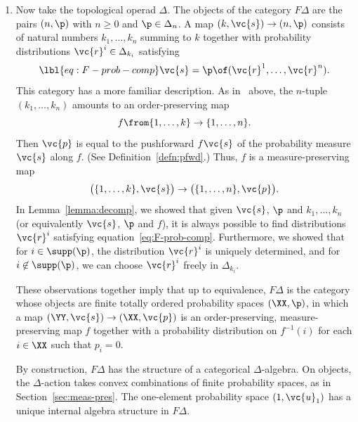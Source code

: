 \begin{examples}
\begin{enumerate}
\item
{}
Now take the topological operad $\Delta$.%
%
%
%
% 
The objects of the category $F\Delta$ are the pairs $(n, \p)$ with $n \geq
0$ and $\p \in \Delta_n$.  A map $(k, \vc{s}) \to (n, \p)$ consists of
natural numbers $k_1, \ldots, k_n$ summing to $k$ together with probability
distributions $\vc{r}^i \in \Delta_{k_i}$ satisfying
% 
\begin{equation}
\lbl{eq:F-prob-comp}
\vc{s} = \p \of (\vc{r}^1, \ldots, \vc{r}^n).
\end{equation}
% 
This category has a more familiar description. As
in~ above, the $n$-tuple $(k_1, \ldots, k_n)$ amounts to an
order-preserving map
\[
f \from \{1, \ldots, k\} \to \{1, \ldots, n\}.  
\]
Then $\vc{p}$ is equal to the pushforward $f \vc{s}$ of the probability
measure $\vc{s}$ along $f$. (See Definition~\ref{defn:pfwd}.)  Thus, $f$ is
a measure-preserving map
\[
\bigl( \{1, \ldots, k\}, \vc{s} \bigr)
 \to 
\bigl( \{1, \ldots, n\}, \vc{p} \bigr).
\]
In Lemma~\ref{lemma:decomp}, we showed that given $\vc{s}$, $\p$ and $k_1,
\ldots, k_n$ (or equivalently $\vc{s}$, $\p$ and $f$), it is always
possible to find distributions $\vc{r}^i$ satisfying
equation~\eqref{eq:F-prob-comp}.  Furthermore, we showed that for $i \in
\supp(\p)$, the distribution $\vc{r}^i$ is uniquely determined, and for $i
\not\in \supp(\p)$, we can choose $\vc{r}^i$ freely in $\Delta_{k_i}$.

These observations together imply that up to equivalence,
$F\Delta$ is the category whose objects are finite totally ordered%
%
%  
probability spaces $(\XX, \p)$, in which a map
$(\YY, \vc{s}) \to (\XX, \vc{p})$ is an order-preserving,
measure-preserving map $f$ together with a probability distribution on
$f^{-1}(i)$ for each $i \in \XX$ such that $p_i = 0$.

By construction, $F\Delta$ has the structure of a categorical
$\Delta$-algebra.  On objects, the $\Delta$-action takes convex combinations
of finite probability spaces, as in Section~\ref{sec:meas-pres}.
The one-element probability space $(1, \vc{u}_1)$ has a unique internal
algebra structure in $F\Delta$.
\end{enumerate}
\end{examples}

